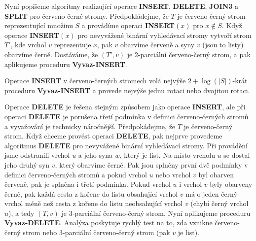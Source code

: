 \documentclass[a4paper,12pt]{article}
\begin{document}
\midinsert
\centerline{}
\endcaption
\endinsert
\newpage

\midinsert
\centerline{}
\endcaption
\endinsert

\midinsert
\centerline{}
\endcaption
\endinsert

Nyní popíšeme algoritmy realizující operace {\bf INSERT}, 
{\bf DE\-LE\-TE}, {\bf JOIN3} a {\bf SPLIT} pro červeno-černé stromy.  
Před\-po\-klá\-dejme, že $T$ je červeno-černý strom reprezentující 
množinu $S$ a pro\-vá\-dí\-me operaci {\bf INSERT$(x)$} pro $
x\notin S$.  Když 
ope\-race {\bf IN\-SERT$(x)$} pro nevyvážené binární vyhledávací stro\-my 
vytvoří strom $T'$, kde vrchol $v$ reprezentuje $x$, pak $
v$ 
obar\-ví\-me červeně a syny $v$ (jsou to listy) obarvíme černě.  
Dostáváme, že $(T',v)$ je 2-parciální červeno-černý strom, a pak 
aplikujeme proceduru {\bf Vyvaz-INSERT}.  

Operace {\bf INSERT} v červeno-černých stromech 
volá nejvýše $2+\log(|S|)$-krát proceduru {\bf Vyvaz-INSERT} a 
provede nejvýše jednu rotaci nebo dvojitou rotaci.

Operace {\bf DELETE} je řešena stejným způsobem 
jako ope\-race {\bf INSERT}, ale při operaci {\bf DELETE} je porušena třetí 
pod\-mín\-ka v definici červeno-černých stro\-mů a 
vyvažování je technicky náročnější.  
Předpokádejme, že $T$ je červeno-černý strom. Když chceme 
provést operaci {\bf DELETE}, pak nejprve provedeme algoritmus {\bf DELETE} 
pro nevyvážené 
binární vyhledávací stro\-my. Při provádění jsme 
odstranili vrchol $u$ a jeho syna $w$, který je list. Na 
místo vrcholu $u$ se dostal jeho druhý syn $v$, který 
obarvíme černě. Pak jsou splněny první 
dvě podmínky v definici červeno-černých 
stromů a pokud vrchol $u$ nebo vrchol $v$ byl
obarven červeně, pak je splněna i 
třetí podmínka. Pokud vrchol $u$ i vrchol $v$ byly obarveny 
černě, pak každá cesta z kořene do listu obsahující 
vrchol $v$ má o jeden černý  vrchol méně  než cesta z 
kořene do listu neobsahující vrchol $v$ (chybí černý  
vrchol $u$), a tedy $(T,v)$ je 3-parciální červeno-černý strom. 
Nyní aplikujeme proceduru {\bf Vyvaz-DELETE}.
Analýza poskytuje rychlý test na to, zda 
vznikne červeno-černý strom nebo 3-parciální 
červeno-černý strom (pak $v$ je list). 
\end{document}
